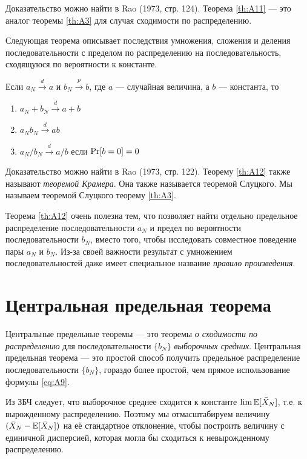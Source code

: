 Доказательство можно найти в Rao (1973, стр. 124). Теорема \ref{th:A11} --- это аналог теоремы \ref{th:A3} для случая сходимости по распределению.

Следующая теорема описывает последствия умножения, сложения и деления последовательности с пределом по распределению на последовательность, сходящуюся по вероятности к константе.

\begin{theorem}
\label{th:A12}
Если $a_N \overset{d}{\to} a$ и $b_N \overset{p}{\to} b$, где $a$ --- случайная величина, а $b$ --- константа, то

\begin{enumerate}
\item $a_N+b_N \overset{d}{\to} a+ b$ 
\item $a_Nb_N \overset{d}{\to} a b$ 
\item $a_N/b_N \overset{d}{\to} a/ b$ если $\P[b=0]=0$
\end{enumerate}
\end{theorem}

Доказательство можно найти в Rao (1973, стр. 122). Теорему \ref{th:A12} также называют \textit{теоремой Крамера}. Она также называется теоремой Слуцкого. Мы называем теоремой Слуцкого теорему \ref{th:A3}.

Теорема \ref{th:A12} очень полезна тем, что позволяет найти отдельно предельное распределение последовательности $a_N$ и предел по вероятности последовательности $b_N$, вместо того, чтобы исследовать совместное поведение пары $a_N$ и $b_N$. Из-за своей важности результат с умножением последовательностей даже имеет специальное название \textit{правило произведения}.

\section{Центральная предельная теорема}

Центральные предельные теоремы --- это теоремы \textit{о сходимости по распределению} для последовательности $\{b_N\}$  \textit{выборочных средних}. Центральная предельная теорема --- это простой способ получить предельное распределение последовательности $\{b_N\}$, гораздо более простой, чем прямое использование формулы \ref{eq:A9}.

Из ЗБЧ следует, что выборочное среднее сходится к константе $\lim \E[\bar{X}_N]$, т.е. к вырожденному распределению. Поэтому мы отмасштабируем величину $(\bar{X}_N-\E[\bar{X}_N])$ на её стандартное отклонение, чтобы построить величину с единичной дисперсией, которая могла бы сходиться к невырожденному распределению.

